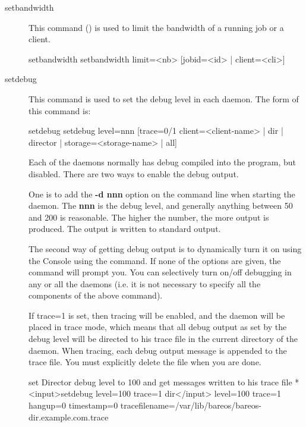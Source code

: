 \begin{description}
\item[setbandwidth]
  This command () is used to limit the bandwidth of a running job or a client.

\begin{bconsole}{setbandwidth}
setbandwidth limit=<nb> [jobid=<id> | client=<cli>]
\end{bconsole}


\item [setdebug]
   \label{bcommandSetdebug}
   This command is used to set the debug level in each  daemon. The form of this
   command is:

\begin{bconsole}{setdebug}
setdebug level=nnn [trace=0/1 client=<client-name> | dir | director | storage=<storage-name> | all]
\end{bconsole}

   Each of the daemons normally has debug compiled into the program, but
   disabled. There are two ways to enable the debug output.

    One is to add the
   {\bf -d nnn} option on the command line when starting the daemon. 
   The {\bf nnn} is the debug level, and generally anything between 50 and 200 is
   reasonable. The higher the number, the more output is produced. The output is
   written to standard output.

   The second way of getting debug output is to dynamically turn it on using the
   Console using the  command.
   If none of the options are given, the command will prompt you. You can
   selectively turn on/off debugging in any or all the daemons (i.e. it is not
   necessary to specify all the components of the above command).

   If trace=1 is set, then tracing will be enabled, and the daemon will be
   placed in trace mode, which means that all debug output as set by the
   debug level will be directed to his trace file in the
   current directory of the daemon.  When tracing, each debug output message is
   appended to the trace file.  You must explicitly delete the file when
   you are done.

\begin{bconsole}{set Director debug level to 100 and get messages written to his trace file}
*<input>setdebug level=100 trace=1 dir</input>
level=100 trace=1 hangup=0 timestamp=0 tracefilename=/var/lib/bareos/bareos-dir.example.com.trace
\end{bconsole}


\end{description}
